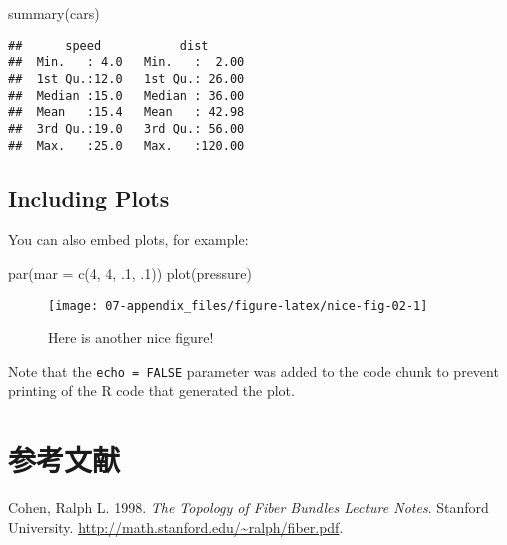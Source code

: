 \documentclass[
  lang=cn,
  titlestyle=hang,
  chinesefont=ctexfont]{elegantbook}
\newenvironment{Shaded}{\begin{snugshade}}{\end{snugshade}}
\newcommand{\AttributeTok}[1]{\textcolor[rgb]{0.77,0.63,0.00}{#1}}
\newcommand{\DecValTok}[1]{\textcolor[rgb]{0.00,0.00,0.81}{#1}}
\newcommand{\FunctionTok}[1]{\textcolor[rgb]{0.00,0.00,0.00}{#1}}
\newcommand{\NormalTok}[1]{#1}
\newlength{\cslhangindent}
\newlength{\cslentryspacingunit} %
\newenvironment{CSLReferences}[2] %
 {%
  \setlength{\parindent}{0pt}
  \ifodd #1
  \let\oldpar\par
  \def\par{\hangindent=\cslhangindent\oldpar}
  \fi
  \setlength{\parskip}{#2\cslentryspacingunit}
 }%
 {}
\begin{document}
\begin{Shaded}
\begin{Highlighting}[]
\FunctionTok{summary}\NormalTok{(cars)}
\end{Highlighting}
\end{Shaded}

\begin{verbatim}
##      speed           dist       
##  Min.   : 4.0   Min.   :  2.00  
##  1st Qu.:12.0   1st Qu.: 26.00  
##  Median :15.0   Median : 36.00  
##  Mean   :15.4   Mean   : 42.98  
##  3rd Qu.:19.0   3rd Qu.: 56.00  
##  Max.   :25.0   Max.   :120.00
\end{verbatim}

\hypertarget{including-plots}{%
\section{Including Plots}\label{including-plots}}

You can also embed plots, for example:

\begin{Shaded}
\begin{Highlighting}[]
\FunctionTok{par}\NormalTok{(}\AttributeTok{mar =} \FunctionTok{c}\NormalTok{(}\DecValTok{4}\NormalTok{, }\DecValTok{4}\NormalTok{, .}\DecValTok{1}\NormalTok{, .}\DecValTok{1}\NormalTok{))}
\FunctionTok{plot}\NormalTok{(pressure)}
\end{Highlighting}
\end{Shaded}

\begin{figure}

{\centering \texttt{[image: 07-appendix\_files/figure-latex/nice-fig-02-1]} 

}

\caption{Here is another nice figure!}\label{fig:nice-fig-02}
\end{figure}

Note that the \texttt{echo\ =\ FALSE} parameter was added to the code chunk to prevent printing of the R code that generated the plot.

\hypertarget{References}{%
\chapter*{参考文献}\label{References}}

\hypertarget{refs}{}
\begin{CSLReferences}{1}{0}
\leavevmode{}%
Cohen, Ralph L. 1998. \emph{The Topology of Fiber Bundles Lecture Notes}. Stanford University. \url{http://math.stanford.edu/~ralph/fiber.pdf}.

\end{CSLReferences}
\end{document}

